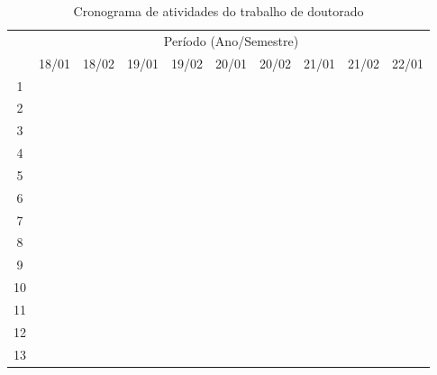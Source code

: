 \documentclass[tese_patricia.tex]{subfiles}
\begin{document}
\begin{center}
\begin{table}[h!]
	\caption{Cronograma de atividades do trabalho de doutorado}
	\centering
	\begin{tabular}{|c|c|c|c|c|c|c|c|c|c|}\hline
		& \multicolumn{9}{c|}{Período (Ano/Semestre)}\\ \cline{2-10}
		\raisebox{1.5ex}{Atividade} & 18/01 & 18/02 & 19/01 & 19/02 & 20/01 & 20/02 & 21/01 & 21/02 & 22/01 \\  \hline
	
		1 & \cellcolor{blue!60} & \cellcolor{blue!60} & & & & & & & \\ \hline
		2 & \cellcolor{red!50} &  \cellcolor{red!50} & \cellcolor{red!50} & \cellcolor{red!50} & \cellcolor{red!50} & \cellcolor{red!50} & \cellcolor{red!50} & \cellcolor{red!50} & \cellcolor{red!50} \\ \hline
		3 & & & \cellcolor{green!50}	& \cellcolor{green!50}  & & & & &	\\ \hline
		4 & & & & \cellcolor{yellow!30} & \cellcolor{yellow!30} & &  &  &\\ \hline
		5 & & & & & \cellcolor{orange!50} & \cellcolor{orange!50} & &  & \\ \hline
		6 & & & & & \cellcolor{black!20} & \cellcolor{black!20} & & &\\ \hline
		7 & & & & & & \cellcolor{pink!70} & &  & \\ \hline
		8 & & & & & \cellcolor{blue!30} & \cellcolor{blue!30} & \cellcolor{blue!30} & & \\ \hline
		9 & & & & & & \cellcolor{green!20} & \cellcolor{green!20} & & \\ \hline
		10 & & & & & & & \cellcolor{cyan!100} & & \\ \hline
		11 & & & & & & & \cellcolor{magenta!80} & & \\ \hline
		12 & & & & & & & & \cellcolor{red!70} & \cellcolor{red!70}\\ \hline
	    13 & & & & & & \cellcolor{blue!70} & \cellcolor{blue!70} & \cellcolor{blue!70}  & \cellcolor{blue!70} \\ \hline
	\end{tabular}
	\label{tab:desenvolvimento}
\end{table}
\end{center}


%
%
\end{document}
